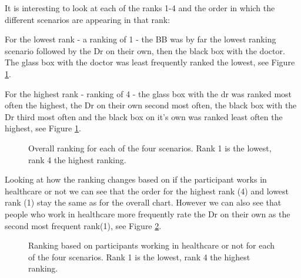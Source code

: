\documentclass[manuscript,screen,review]{acmart}
\begin{document}
It is interesting to look at each of the ranks 1-4 and the order in which the different scenarios are appearing in that rank:

For the lowest rank - a ranking of 1 - the BB was by far the lowest ranking scenario followed by the Dr on their own, then the black box with the doctor. The glass box with the doctor was  least frequently ranked the lowest, see Figure \ref{fig:overall-ranking}.

For the highest rank - ranking of 4 - the glass box with the dr was ranked most often the highest, the Dr on their own second most often, the black box with the Dr third most often and the black box on it's own was ranked least often the highest, see Figure \ref{fig:overall-ranking}.

\begin{figure}[h]
    \caption{Overall ranking for each of the four scenarios. Rank 1 is the lowest, rank 4 the highest ranking.}
    \label{fig:overall-ranking}
\end{figure}

Looking at how the ranking changes based on if the participant works in healthcare or not we can see that the order for the highest rank (4) and lowest rank (1) stay the same as for the overall chart. However we can also see that people who work in healthcare more frequently rate the Dr on their own as the second most frequent rank(1), see Figure \ref{fig:ranking-healthcare}.

\begin{figure}[h]
    \caption{Ranking based on participants working in healthcare or not for each of the four scenarios. Rank 1 is the lowest, rank 4 the highest ranking.}
    \label{fig:ranking-healthcare}
\end{figure}
\end{document}
